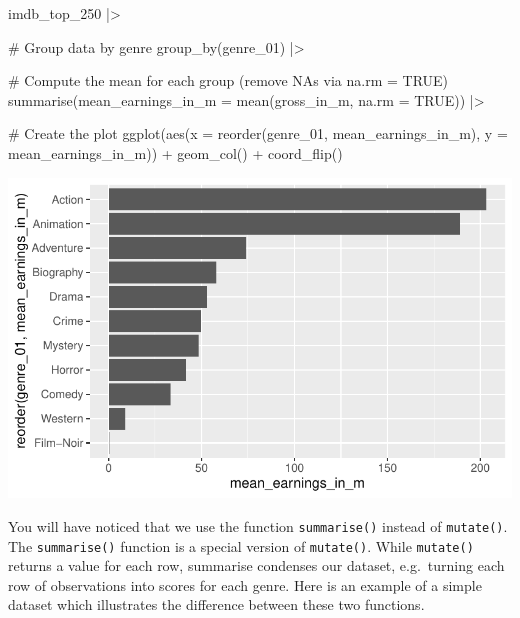 \documentclass[
  letterpaper,
]{krantz}
\makeatletter
\newenvironment{Shaded}{\begin{snugshade}}{\end{snugshade}}
\newcommand{\AttributeTok}[1]{\textcolor[rgb]{0.40,0.45,0.13}{#1}}
\newcommand{\CommentTok}[1]{\textcolor[rgb]{0.37,0.37,0.37}{#1}}
\newcommand{\ConstantTok}[1]{\textcolor[rgb]{0.56,0.35,0.01}{#1}}
\newcommand{\FunctionTok}[1]{\textcolor[rgb]{0.28,0.35,0.67}{#1}}
\newcommand{\NormalTok}[1]{\textcolor[rgb]{0.00,0.23,0.31}{#1}}
\newcommand{\SpecialCharTok}[1]{\textcolor[rgb]{0.37,0.37,0.37}{#1}}
\newenvironment{kframe}{%
\medskip{}
\setlength{\fboxsep}{.8em}
 \def\at@end@of@kframe{}%
 \ifinner\ifhmode%
  \def\at@end@of@kframe{\end{minipage}}%
  \begin{minipage}{\columnwidth}%
 \fi\fi%
 \def\FrameCommand##1{\hskip\@totalleftmargin \hskip-\fboxsep
 \colorbox{shadecolor}{##1}\hskip-\fboxsep
     \hskip-\linewidth \hskip-\@totalleftmargin \hskip\columnwidth}%
 \MakeFramed {\advance\hsize-\width
   \@totalleftmargin\z@ \linewidth\hsize
   \@setminipage}}%
 {\par\unskip\endMakeFramed%
 \at@end@of@kframe}
\renewenvironment{Shaded}{\begin{kframe}}{\end{kframe}}
\makeatother
\begin{document}
\begin{Shaded}
\begin{Highlighting}[]
\NormalTok{imdb\_top\_250 }\SpecialCharTok{|\textgreater{}}
  
  \CommentTok{\# Group data by genre}
  \FunctionTok{group\_by}\NormalTok{(genre\_01) }\SpecialCharTok{|\textgreater{}}
  
  \CommentTok{\# Compute the mean for each group (remove NAs via na.rm = TRUE)}
  \FunctionTok{summarise}\NormalTok{(}\AttributeTok{mean\_earnings\_in\_m =} \FunctionTok{mean}\NormalTok{(gross\_in\_m, }\AttributeTok{na.rm =} \ConstantTok{TRUE}\NormalTok{)) }\SpecialCharTok{|\textgreater{}}
  
  \CommentTok{\# Create the plot}
  \FunctionTok{ggplot}\NormalTok{(}\FunctionTok{aes}\NormalTok{(}\AttributeTok{x =} \FunctionTok{reorder}\NormalTok{(genre\_01, mean\_earnings\_in\_m), }\AttributeTok{y =}\NormalTok{ mean\_earnings\_in\_m)) }\SpecialCharTok{+}
  \FunctionTok{geom\_col}\NormalTok{() }\SpecialCharTok{+}
  \FunctionTok{coord\_flip}\NormalTok{()}
\end{Highlighting}
\end{Shaded}

\includegraphics{08_descriptive_statistics_files/figure-pdf/plotting-mean-movie-genre-earnings-1.pdf}

You will have noticed that we use the function \texttt{summarise()}
instead of \texttt{mutate()}. The \texttt{summarise()} function is a
special version of \texttt{mutate()}. While \texttt{mutate()} returns a
value for each row, summarise condenses our dataset, e.g.~turning each
row of observations into scores for each genre. Here is an example of a
simple dataset which illustrates the difference between these two
functions.
\end{document}
